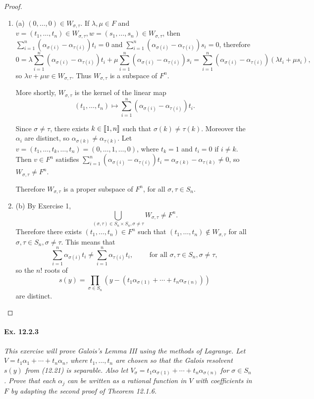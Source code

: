 \documentclass[11pt,a4paper]{article}
\def\gcro{\mbox{[\hspace{-.15em}[}}%
\def\dcro{\mbox{]\hspace{-.15em}]}}
\newcommand{\be} {\begin{enumerate}}
\newcommand{\ee} {\end{enumerate}}
\begin{document}
\begin{proof}
\be
\item[(a)] $(0,\ldots,0) \in W_{\sigma,\tau}$. If $\lambda, \mu \in F$  and  $ v = (t_1,\ldots,t_n) \in W_{\sigma,\tau}, w = (s_1,\ldots,s_n) \in W_{\sigma,\tau}$, then $ \sum_{i=1}^n (\alpha_{\sigma(i)} - \alpha_{\tau(i)}) t_i = 0$ and $ \sum_{i=1}^n (\alpha_{\sigma(i)} - \alpha_{\tau(i)}) s_i = 0$, therefore
$$0 =  \lambda \sum_{i=1}^n (\alpha_{\sigma(i)} - \alpha_{\tau(i)}) t_i  + \mu\sum_{i=1}^n (\alpha_{\sigma(i)} - \alpha_{\tau(i)}) s_i =  \sum_{i=1}^n (\alpha_{\sigma(i)} - \alpha_{\tau(i)}) (\lambda t_i + \mu s_i),$$
so $\lambda v + \mu w \in W_{\sigma,\tau}$. Thus $W_{\sigma,\tau}$ is a subspace of $F^n$.

More shortly, $W_{\sigma,\tau}$ is the kernel of the linear map $$(t_1,\ldots,t_n) \mapsto \sum_{i=1}^n (\alpha_{\sigma(i)} - \alpha_{\tau(i)}) t_i.$$

Since $\sigma \ne \tau$, there exists $k \in \gcro 1, n \dcro$ such that $\sigma(k) \ne \tau(k)$. Moreover the $\alpha_i$ are distinct, so $\alpha_{\sigma(k)} \ne \alpha_{\tau(k)}$. Let $v = (t_1,\ldots,t_k, \ldots,t_n) = (0,\ldots,1,\ldots,0)$, where $t_k = 1$ and $t_i = 0$ if $i\ne k$. Then $v \in F^n$ satisfies $ \sum_{i=1}^n (\alpha_{\sigma(i)} - \alpha_{\tau(i)}) t_i  = \alpha_{\sigma(k)} - \alpha_{\tau(k)} \ne 0$, so $W_{\sigma,\tau} \ne F^n$.

Therefore $W_{\sigma,\tau}$ is a proper subspace of $F^n$, for all $\sigma, \tau \in S_n$.

\item[(b)] By Exercise 1, 
$$\bigcup_{(\sigma,\tau) \in S_n \times S_n, \sigma \ne \tau} W_{\sigma,\tau} \ne F^n.$$
Therefore there exists $(t_1,\ldots,t_n) \in F^n$ such that $(t_1,\ldots,t_n) \not \in W_{\sigma,\tau}$ for all $\sigma,\tau \in S_n, \sigma \ne \tau$. This means that
$$\sum_{i=1}^n \alpha_{\sigma(i)}t_i \ne  \sum_{i=1}^n \alpha_{\tau(i)}t_i,\qquad \text { for all } \sigma,\tau \in S_n, \sigma \ne \tau,$$
so the $n!$ roots of 
$$s(y) = \prod_{\sigma \in S_n}  \left(y - (t_1\alpha_{\sigma(1)} + \cdots + t_n \alpha_{\sigma(n)})\right)$$
are distinct.
\ee
\end{proof}

\paragraph{Ex. 12.2.3}

{\it This exercise will prove Galois's Lemma III using the methods of Lagrange. Let $V = t_1\alpha_1 + \cdots + t_n \alpha_n$, where $t_1,\ldots,t_n$ are chosen so that the Galois resolvent $s(y)$ from (12.21) is separable. Also let $V_{\sigma} = t_1 \alpha_{\sigma(1)} + \cdots + t_n \alpha_{\sigma(n)}$ for $\sigma \in S_n$. Prove that each $\alpha_j$ can be written as a rational function in $V$ with coefficients in $F$ by adapting the second proof of Theorem 12.1.6.
}
\end{document}

